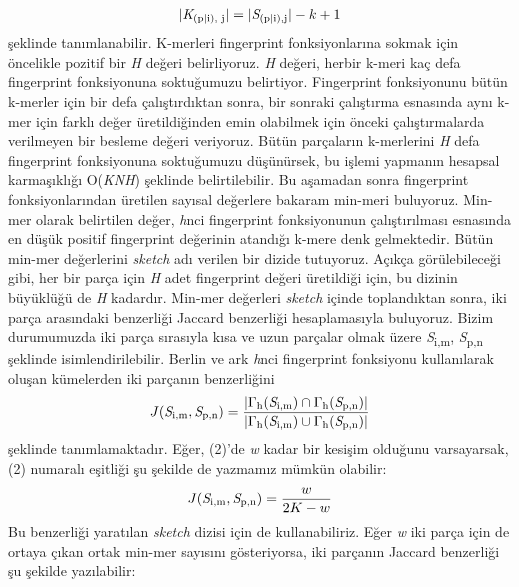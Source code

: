 \begin{gather*}
| \textit{K}\textsubscript{(p\textbar i), j} | = |\textit{S}\textsubscript{(p\textbar i),j}| - k + 1
\end{gather*}
şeklinde tanımlanabilir. K-merleri fingerprint fonksiyonlarına sokmak için öncelikle pozitif bir \textit{H} değeri belirliyoruz. \textit{H} değeri, herbir k-meri kaç defa fingerprint fonksiyonuna soktuğumuzu belirtiyor. Fingerprint fonksiyonunu bütün k-merler için bir defa çalıştırdıktan sonra, bir sonraki çalıştırma esnasında aynı k-mer için farklı değer üretildiğinden emin olabilmek için önceki çalıştırmalarda verilmeyen bir besleme değeri veriyoruz. Bütün parçaların k-merlerini \textit{H} defa fingerprint fonksiyonuna soktuğumuzu düşünürsek, bu işlemi yapmanın hesapsal karmaşıklığı O(\textbar\textit{K}\textbar\textit{N}\textit{H}) şeklinde belirtilebilir. Bu aşamadan sonra fingerprint fonksiyonlarından üretilen sayısal değerlere bakaram min-meri buluyoruz. Min-mer olarak belirtilen değer, \textit{h}nci fingerprint fonksiyonunun çalıştırılması esnasında en düşük positif fingerprint değerinin atandığı k-mere denk gelmektedir. Bütün min-mer değerlerini \textit{sketch} adı verilen bir dizide tutuyoruz. Açıkça görülebileceği gibi, her bir parça için \textit{H} adet fingerprint değeri üretildiği için, bu dizinin büyüklüğü de \textit{H} kadardır. Min-mer değerleri \textit{sketch} içinde toplandıktan sonra, iki parça arasındaki benzerliği Jaccard benzerliği \cite{jaccard} hesaplamasıyla buluyoruz. Bizim durumumuzda iki parça sırasıyla kısa ve uzun parçalar olmak üzere \textit{S}\textsubscript{i,m}, \textit{S}\textsubscript{p,n} şeklinde isimlendirilebilir. Berlin ve ark \textit{h}nci fingerprint fonksiyonu kullanılarak oluşan kümelerden iki parçanın benzerliğini
\begin{equation}
J(\textit{S}\textsubscript{i,m}, \textit{S}\textsubscript{p,n}) = \dfrac{|\Gamma \textsubscript{h}(\textit{S}\textsubscript{i,m}) \cap \Gamma \textsubscript{h}(\textit{S}\textsubscript{p,n})|}{|\Gamma \textsubscript{h}(\textit{S}\textsubscript{i,m}) \cup \Gamma \textsubscript{h}(\textit{S}\textsubscript{p,n})|}
\end{equation}
şeklinde tanımlamaktadır. Eğer, (2)'de \textit{w} kadar bir kesişim olduğunu varsayarsak, (2) numaralı eşitliği şu şekilde de yazmamız mümkün olabilir:
\begin{equation}
J(\textit{S}\textsubscript{i,m}, \textit{S}\textsubscript{p,n}) = \dfrac{w}{2K - w}
\end{equation}
Bu benzerliği yaratılan \textit{sketch} dizisi için de kullanabiliriz. Eğer \textit{w} iki parça için de ortaya çıkan ortak min-mer sayısını gösteriyorsa, iki parçanın Jaccard benzerliği şu şekilde yazılabilir:
